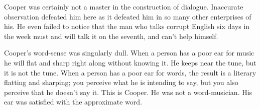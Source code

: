 \documentclass[../interior-demo.tex]{subfiles}
\begin{document}
Cooper was certainly not a master in the construction of dialogue.
Inaccurate observation defeated him here as it defeated him in so many
other enterprises of his. He even failed to notice that the man who
talks corrupt English six days in the week must and will talk it on
the seventh, and can't help himself.

Cooper's word-sense was singularly dull. When a person has a poor ear
for music he will flat and sharp right along without knowing it. He
keeps near the tune, but it is not the tune. When a person has a poor
ear for words, the result is a literary flatting and sharping; you
perceive what he is intending to say, but you also perceive that he
doesn't say it. This is Cooper. He was not a word-musician. His ear was
satisfied with the approximate word.
\end{document}
